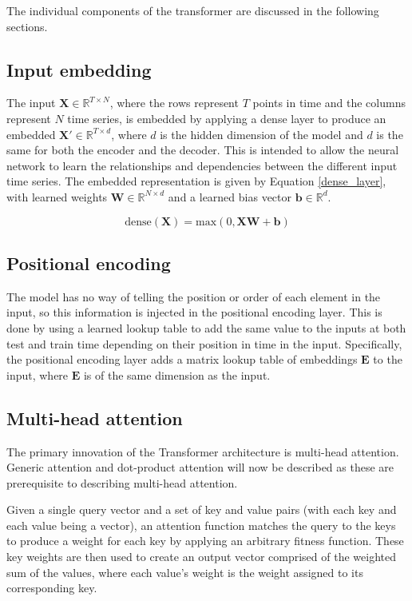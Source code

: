 The individual components of the transformer are discussed in the following sections.

\subsection{Input embedding}
The input $\boldsymbol{X} \in \mathbb{R}^{T \times N}$, where the rows represent $T$ points in time and the columns represent $N$ time series, is embedded by applying a dense layer to produce an embedded $\boldsymbol{X'} \in \mathbb{R}^{T \times d}$, where $d$ is the hidden dimension of the model and $d$ is the same for both the encoder and the decoder.
This is intended to allow the neural network to learn the relationships and dependencies between the different input time series.
The embedded representation is given by Equation \ref{dense_layer}, with learned weights $\boldsymbol{W} \in \mathbb{R}^{N \times d}$ and a learned bias vector $\boldsymbol{b} \in \mathbb{R}^{d}$.

\begin{equation} \label{dense_layer}
\text{dense}(\boldsymbol{X}) = \text{max}(0, \boldsymbol{XW} + \boldsymbol{b})
\end{equation}

\subsection{Positional encoding} \label{sec:positional_encoding}
The model has no way of telling the position or order of each element in the input, so this information is injected in the positional encoding layer.
This is done by using a learned lookup table to add the same value to the inputs at both test and train time depending on their position in time in the input.
Specifically, the positional encoding layer adds a matrix lookup table of embeddings $\boldsymbol{E}$ to the input, where $\boldsymbol{E}$ is of the same dimension as the input.

\subsection{Multi-head attention} \label{multihead_attention}
The primary innovation of the Transformer architecture is multi-head attention.
Generic attention and dot-product attention will now be described as these are prerequisite to describing multi-head attention.

Given a single query vector and a set of key and value pairs (with each key and each value being a vector), an attention function matches the query to the keys to produce a weight for each key by applying an arbitrary fitness function.
These key weights are then used to create an output vector comprised of the weighted sum of the values, where each value's weight is the weight assigned to its corresponding key. 

